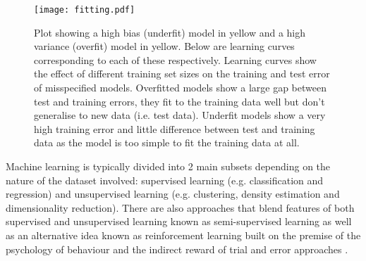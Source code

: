 \begin{figure}[h]
    \texttt{[image: fitting.pdf]}
    \caption[Explanation of Learning Curves and Fitting]{Plot showing a high bias (underfit) model in yellow and a high variance (overfit) model in yellow.
        Below are learning curves corresponding to each of these respectively.
        Learning curves show the effect of different training set sizes on the training and test error of misspecified models.
        Overfitted models show a large gap between test and training errors, they fit to the training data well but don't generalise
        to new data (i.e. test data).
        Underfit models show a very high training error and little difference between test and training data as the model is too simple
        to fit the training data at all.
    }
    \label{fig:fitting}
\end{figure}





Machine learning is typically divided into 2 main subsets depending on the nature of the dataset involved: 
supervised learning (e.g. classification and regression) and unsupervised learning (e.g. clustering,
density estimation and dimensionality reduction).
There are also approaches that blend features of both supervised and unsupervised learning known as semi-supervised
learning as well as an alternative idea known as reinforcement learning built on the premise of the psychology
of behaviour and the indirect reward of trial and error approaches \citep{Bishop2006}.



